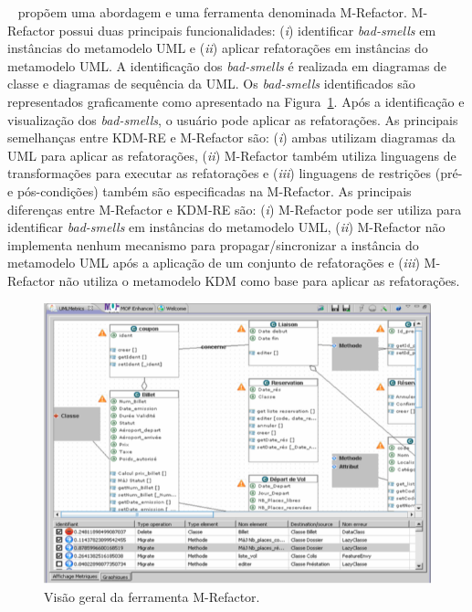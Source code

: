 ~ propõem uma abordagem e uma ferramenta denominada M-Refactor. M-Refactor possui duas principais funcionalidades: (\textit{i}) identificar \textit{bad-smells} em instâncias do metamodelo UML e (\textit{ii}) aplicar refatorações em instâncias do metamodelo UML. A identificação dos \textit{bad-smells} é realizada em diagramas de classe e diagramas de sequência da UML. Os \textit{bad-smells} identificados são representados graficamente como apresentado na Figura~\ref{fig:m_refactor}. Após a identificação e visualização dos \textit{bad-smells}, o usuário pode aplicar as refatorações. As principais semelhanças entre KDM-RE e M-Refactor são: (\textit{i}) ambas utilizam diagramas da UML para aplicar as refatorações, (\textit{ii}) M-Refactor também utiliza linguagens de transformações para executar as refatorações e (\textit{iii}) linguagens de restrições (pré- e pós-condições) também são especificadas na M-Refactor. As principais diferenças entre M-Refactor e KDM-RE são: (\textit{i}) M-Refactor pode ser utiliza para identificar \textit{bad-smells} em instâncias do metamodelo UML, (\textit{ii}) M-Refactor não implementa nenhum mecanismo para propagar/sincronizar a instância do metamodelo UML após a aplicação de um conjunto de refatorações e (\textit{iii}) M-Refactor não utiliza o metamodelo KDM como base para aplicar as refatorações.


\begin{figure}[h]
	\centering
	\caption{Visão geral da ferramenta M-Refactor.}
	\label{fig:m_refactor}
	\includegraphics[scale=0.6]{images/m_refactor}
\end{figure}

